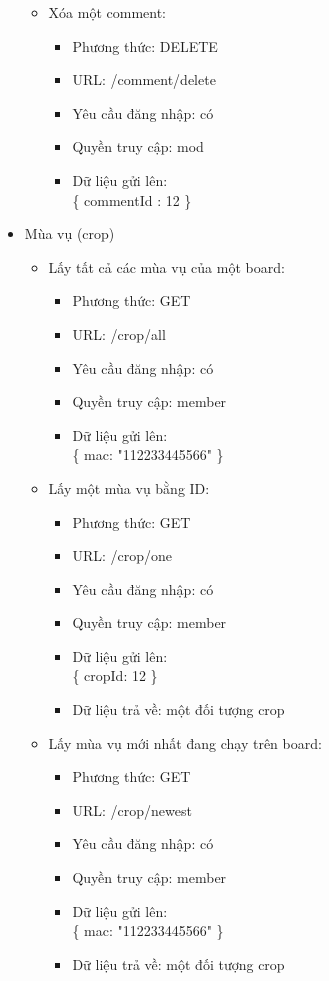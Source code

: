 \documentclass[a4paper,12pt,oneside]{article}
\begin{document}
\begin{itemize}
\begin{itemize}
\item Xóa một comment:
	\begin{itemize}
	\item Phương thức: DELETE
	\item URL: /comment/delete
	\item Yêu cầu đăng nhập: có
	\item Quyền truy cập: mod
	\item Dữ liệu gửi lên:\\ 
		\{
			commentId : 12
		\}
	\end{itemize}
\end{itemize}

\item Mùa vụ (crop)
\begin{itemize}
\item Lấy tất cả các mùa vụ của một board:
	\begin{itemize}
	\item Phương thức: GET
	\item URL: /crop/all
	\item Yêu cầu đăng nhập: có
	\item Quyền truy cập: member
	\item Dữ liệu gửi lên:\\ 
		\{
			mac: "112233445566"
		\}
	\end{itemize}
	
\item Lấy một mùa vụ bằng ID:
	\begin{itemize}
	\item Phương thức: GET
	\item URL: /crop/one
	\item Yêu cầu đăng nhập: có
	\item Quyền truy cập: member
	\item Dữ liệu gửi lên:\\ 
		\{
			cropId: 12
		\}
	\item Dữ liệu trả về: một đối tượng crop
	\end{itemize}
	
\item Lấy mùa vụ mới nhất đang chạy trên board:
	\begin{itemize}
	\item Phương thức: GET
	\item URL: /crop/newest
	\item Yêu cầu đăng nhập: có
	\item Quyền truy cập: member
	\item Dữ liệu gửi lên:\\ 
		\{
			mac: "112233445566"
		\}
	\item Dữ liệu trả về: một đối tượng crop
	\end{itemize}


\end{itemize}
\end{itemize}
\end{document}
